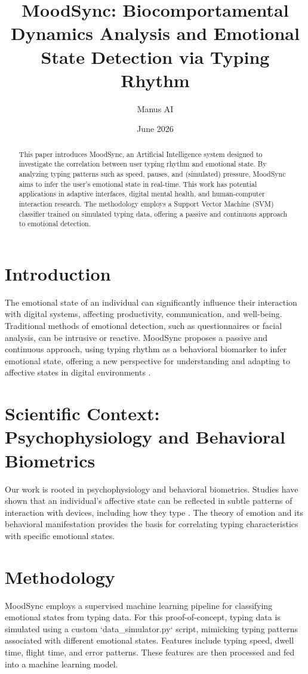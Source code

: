 \documentclass{article}
\title{MoodSync: Biocomportamental Dynamics Analysis and Emotional State Detection via Typing Rhythm}
\author{Manus AI}
\date{June 2026}
\begin{document}
\maketitle

\begin{abstract}
This paper introduces MoodSync, an Artificial Intelligence system designed to investigate the correlation between user typing rhythm and emotional state. By analyzing typing patterns such as speed, pauses, and (simulated) pressure, MoodSync aims to infer the user's emotional state in real-time. This work has potential applications in adaptive interfaces, digital mental health, and human-computer interaction research. The methodology employs a Support Vector Machine (SVM) classifier trained on simulated typing data, offering a passive and continuous approach to emotional detection.
\end{abstract}

\section{Introduction}
The emotional state of an individual can significantly influence their interaction with digital systems, affecting productivity, communication, and well-being. Traditional methods of emotional detection, such as questionnaires or facial analysis, can be intrusive or reactive. MoodSync proposes a passive and continuous approach, using typing rhythm as a behavioral biomarker to infer emotional state, offering a new perspective for understanding and adapting to affective states in digital environments \cite{feit2019typing, russell1980circumplex}.

\section{Scientific Context: Psychophysiology and Behavioral Biometrics}
Our work is rooted in psychophysiology and behavioral biometrics. Studies have shown that an individual's affective state can be reflected in subtle patterns of interaction with devices, including how they type \cite{feit2019typing}. The theory of emotion and its behavioral manifestation \cite{russell1980circumplex} provides the basis for correlating typing characteristics with specific emotional states.

\section{Methodology}
MoodSync employs a supervised machine learning pipeline for classifying emotional states from typing data. For this proof-of-concept, typing data is simulated using a custom `data_simulator.py` script, mimicking typing patterns associated with different emotional states. Features include typing speed, dwell time, flight time, and error patterns. These features are then processed and fed into a machine learning model.
\end{document}
